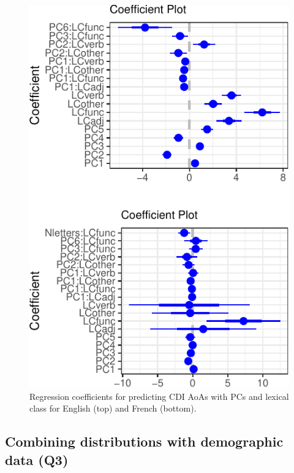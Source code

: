 \documentclass[10pt, letterpaper]{article}
\newenvironment{CodeChunk}{}{}
\begin{document}
\begin{CodeChunk}
\begin{figure}[H]

{\centering \includegraphics{figs/unnamed-chunk-6-1} 

}

\caption[Regression coefficients for predicting CDI AoAs with PCs and lexical class for English (top) and French (bottom)]{Regression coefficients for predicting CDI AoAs with PCs and lexical class for English (top) and French (bottom).}\label{fig:unnamed-chunk-6}
\end{figure}
\end{CodeChunk}

\hypertarget{combining-distributions-with-demographic-data-q3}{%
\subsection{Combining distributions with demographic data
(Q3)}\label{combining-distributions-with-demographic-data-q3}}
\end{document}
